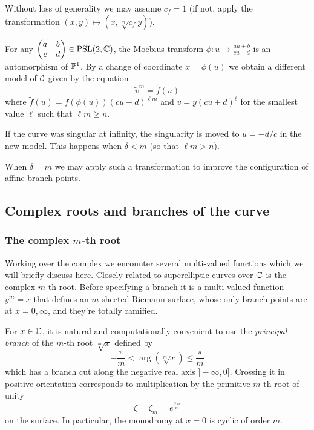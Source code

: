 \documentclass[main.tex]{subfiles}
\begin{document}
  \begin{rmk}
   Without loss of generality we may assume $c_f = 1$ (if not, apply the transformation $(x,y) \mapsto (x,\sqrt[m]{c_f}y)$).
  \end{rmk}
  \begin{rmk}
      \label{rmk:moebius}
      For any $\begin{pmatrix}a&b\\c&d\end{pmatrix}\in\PSl(2,\C)$,
      the Moebius transform $\phi:u\mapsto \frac{au+b}{cu+d}$ is an automorphism
      of $\P^1$. By a change of coordinate $x=\phi(u)$ we obtain a different model of $\cu$
      given by the equation
      \begin{equation*}
          \tilde v^m = \tilde f(u)
      \end{equation*}
      where $\tilde f(u)=f(\phi(u))(cu+d)^{\ell m}$ and $v=y(cu+d)^\ell$ for
      the smallest value $\ell$ such that $\ell m\geq n$.

      If the curve was singular at infinity, the singularity is moved to $u=-d/c$ in the new model.
      This happens when $\delta < m$ (so that $\ell m > n$).

  When $\delta=m$ we may apply such a transformation to improve the configuration
  of affine branch points.
  \end{rmk}

  \subsection{Complex roots and branches of the curve}\label{subsec:roots_branches}

  \subsubsection{The complex $m$-th root}

  Working over the complex we encounter several multi-valued functions
  which we will briefly discuss here.  Closely related to superelliptic
  curves over $\C$ is the complex $m$-th root.
  Before specifying a branch it is a multi-valued function $y^m = x$
  that defines an $m$-sheeted Riemann surface, whose only branch points
  are at $x = 0,\infty$, and they're totally ramified.

  For $x\in\C$, it is natural and computationally convenient to use the
  \emph{principal branch} of the $m$-th root $\sqrt[m]x$ defined by
  \begin{equation*}
      -\frac{π}m<\arg(\sqrt[m]x)\leq\frac{π}m
  \end{equation*}
  which has a branch cut along the negative real axis $]\!-\infty,0]$.
  Crossing it in positive orientation corresponds to multiplication by
  the primitive $m$-th root of unity
  \begin{equation*}
  \zeta = \zeta_m = e^{\frac{2\pi i }{m}}
  \end{equation*}
  on the surface. In
  particular, the monodromy at $x=0$ is cyclic of order $m$.
\end{document}
